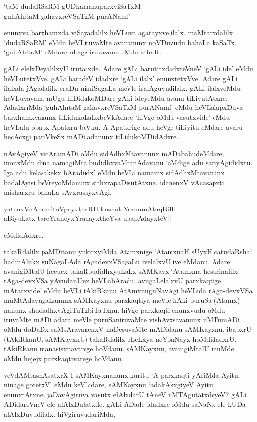 \begin{shloka}
`taM dudaRSaRM gUDhamanuparxviSaTxM\\
guhAhitaM gahavxreVSaTxM purANamf'
\end{shloka}

enunxva barxhamxda viSayadalilx heVLuva agatayxve ilalx. maMtarxdalilx `dudaRSaRM' eMdu heVLiruvaMte avananunx noVDuvudu bahaLa kaSaTx. `guhAhitaM' eMdare oLage iruvavanu eMdu athaR.

gALi elelxDeyalilxyU irutatxde. Adare gALi barutitxdadxreVneV `gALi ide' eMdu heVLutetxVve. gALi baradeV idadxre `gALi ilalx' enunxtetxVve. Adare gALi ilalxda jAgadalilx eraDu nimiSagaLa meVle iralAguvudilalx. gALi ilalxveMdu heVLuvavana mUgu hiDidukoMDare gALi ideyeMdu avanu tiLiyutAtxne. AdadxriMda `guhAhitaM gahavxreVSaTxM purANamf' eMdu heVLalapxDuva barxhamxvanunx tiLidukoLaLxbeVkAdare `hiVge oMdu vasutxvide' eMdu heVLalu obabx Apatxru beVku. A Apatxrige adu heVge tiLiyitu eMdare avaru hecAcxgi pariVkeSx mADi adanunx tiLidukoMDidAdxre.

nAvAgiyeV vicAramADi oMdu sidAdhxMtavanunx mADabahudeMdare, inonxMdu dina namagiMta budidhxvaMtanAdavanu `aMdige adu sariyAgididxtu. Iga adu kelasakekx bAradudx' eMdu heVLi namamx sidAdhxMtavanunx badalAyisi beVreyoMdanunx sithxrapaDisutAtxne. idanenxV vAcasapxti misharxru bahaLa sAvxrasayxvAgi,

\begin{shloka}
yatenxVnAnumitoV\s payxthaRH kushaleYranumAtaqBiH|\\
aBiyukatx tareYraneyxYranayxtheYva upapAdayxteV||
\end{shloka}

eMdidAdxre.

takaRdalilx paMDitanu yukitxyiMda Atamxnige `AtamxnaH sUyxH catudaRsha'. hadinAlukx guNagaLAda rAgadevxVSagaLu ivelalxvU ive eMdanu. Adare avanigiMtalU hecucx takaRbudidhxyuLaLx sAMKayx `Atamxna hesarinalilx rAga-devxVSa yAvudanUnx heVLabAradu. avugaLelalxvU parxkaqtige mAtarxvide' eMdu heVLi tAkiRkanu AtAmxnuguNavAgi heVLida rAga-devxVSa muMtAdavugaLanunx sAMKayxnu parxkaqtiya meVle hAki puruSa (Atamx) nanunx shudadhxvAgiTuTxbiTaTxnu. hiVge parxkaqti enunxvudu oMdu iruvaMte mADi adara meVle puruSaniruvaMte vishAvxsavanunx uMTumADi oMdu doDaDx saMsAravanenxV naDesuvaMte mADidanu sAMKayxnu. ibabxrU (tAkiRkanU, sAMKayxnU) takaRdalilx oLeLxya neYpuNayx hoMdidadxrU, tAkiRkanu manasisxnavarege hoVdanu. sAMKayxnu, avanigiMtalU muMde oMdu hejejx parxkaqtivarege hoVdanu.

veVdAMtashAsatxrX I sAMKayxnanunx kuritu `A parxkaqti yAriMda Ayitu. ninage gotetxV' eMdu keVLidare, sAMKayxnu `adakAkxgiyeV Ayitu' enunxtAtxne. jaDavAgiruva vasutx elAlxdarU tAneV uMTAgutatxdeyeV? gALi ADidareVneV ele alAlxDutatxde. gALi ADade idadxre oMdu saNaNx ele kUDa alAlxDuvudilalx. hiVgiruvudariMda,

